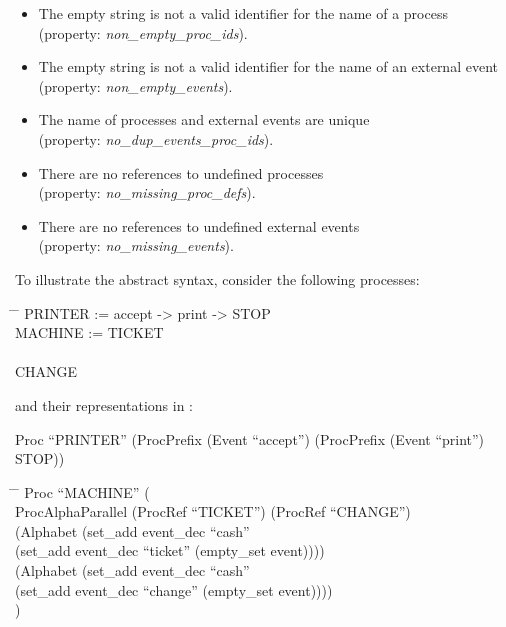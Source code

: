 \begin{itemize}
	\item The empty string is not a valid identifier for the name of a process\\
	(property: \emph{non\_empty\_proc\_ids}).
	\item The empty string is not a valid identifier for the name of an external event\\
	(property: \emph{non\_empty\_events}).
	\item The name of processes and external events are unique\\
	(property: \emph{no\_dup\_events\_proc\_ids}).
	\item There are no references to undefined processes\\
	(property: \emph{no\_missing\_proc\_defs}).
	\item There are no references to undefined external events\\
	(property: \emph{no\_missing\_events}).
\end{itemize}

To illustrate the \CSPcoq{} abstract syntax, consider the following \CSPM{} processes:
%
\begin{tabbing}
	\hspace*{1em}\= \hspace*{5.4em} \= \kill
	PRINTER := accept -> print -> STOP\\
	MACHINE := TICKET\\
	\>\\
	\>\> CHANGE
\end{tabbing}
%
\noindent{}and their representations in \CSPcoq{}:
%
\begin{flushleft}
	Proc ``PRINTER'' (ProcPrefix (Event ``accept'') (ProcPrefix (Event ``print'') STOP))
\end{flushleft}

\begin{tabbing}
	\hspace*{1em}\= \hspace*{2em} \= \kill
	Proc ``MACHINE'' (\\
	\>	ProcAlphaParallel (ProcRef ``TICKET'') (ProcRef ``CHANGE'')\\
	\>	(Alphabet (set\_add event\_dec ``cash''\\
	\>\> (set\_add event\_dec ``ticket'' (empty\_set event))))\\
	\>	(Alphabet (set\_add event\_dec ``cash''\\
	\>\> (set\_add event\_dec ``change'' (empty\_set event))))\\
	)
\end{tabbing}

